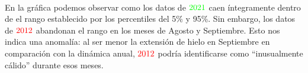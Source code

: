 \documentclass[11pt]{article}
\begin{document}
    \begin{center}
    \end{center}
    { \hspace*{\fill} \\}
    
    En la gráfica podemos observar como los datos de
\(\color{green}{\text{2021}}\) caen íntegramente dentro de el rango
establecido por los percentiles del 5\% y 95\%. Sin embargo, los datos
de \(\color{red}{\text{2012}}\) abandonan el rango en los meses de
Agosto y Septiembre. Esto nos indica una anomalía: al ser menor la
extensión de hielo en Septiembre en comparación con la dinámica anual,
\(\color{red}{\text{2012}}\) podría identificarse como ``inusualmente
cálido'' durante esos meses.


    
    
    
    
\end{document}
